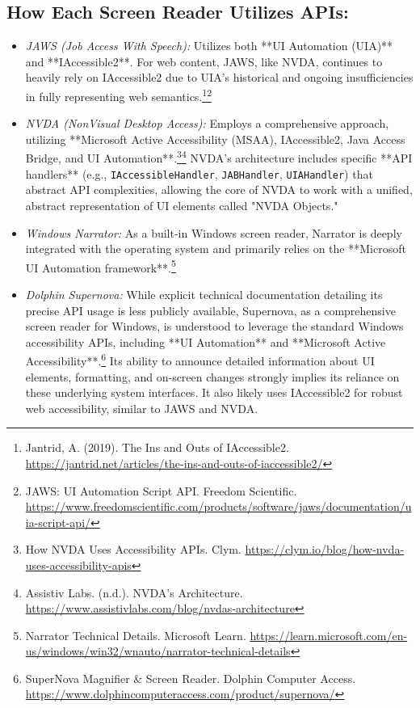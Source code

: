 \subsection*{How Each Screen Reader Utilizes APIs:}
\begin{itemize}
    \item \emph{JAWS (Job Access With Speech):} Utilizes both **UI Automation (UIA)** and **IAccessible2**. For web content, JAWS, like NVDA, continues to heavily rely on IAccessible2 due to UIA's historical and ongoing insufficiencies in fully representing web semantics.\footnote{Jantrid, A. (2019). The Ins and Outs of IAccessible2. \url{https://jantrid.net/articles/the-ins-and-outs-of-iaccessible2/}}\footnote{JAWS: UI Automation Script API. Freedom Scientific. \url{https://www.freedomscientific.com/products/software/jaws/documentation/uia-script-api/}}
    \item \emph{NVDA (NonVisual Desktop Access):} Employs a comprehensive approach, utilizing **Microsoft Active Accessibility (MSAA), IAccessible2, Java Access Bridge, and UI Automation**.\footnote{How NVDA Uses Accessibility APIs. Clym. \url{https://clym.io/blog/how-nvda-uses-accessibility-apis}}\footnote{Assistiv Labs. (n.d.). NVDA's Architecture. \url{https://www.assistivlabs.com/blog/nvdas-architecture}} NVDA's architecture includes specific **API handlers** (e.g., \texttt{IAccessibleHandler}, \texttt{JABHandler}, \texttt{UIAHandler}) that abstract API complexities, allowing the core of NVDA to work with a unified, abstract representation of UI elements called "NVDA Objects."
    \item \emph{Windows Narrator:} As a built-in Windows screen reader, Narrator is deeply integrated with the operating system and primarily relies on the **Microsoft UI Automation framework**.\footnote{Narrator Technical Details. Microsoft Learn. \url{https://learn.microsoft.com/en-us/windows/win32/wnauto/narrator-technical-details}}
    \item \emph{Dolphin Supernova:} While explicit technical documentation detailing its precise API usage is less publicly available, Supernova, as a comprehensive screen reader for Windows, is understood to leverage the standard Windows accessibility APIs, including **UI Automation** and **Microsoft Active Accessibility**.\footnote{SuperNova Magnifier \& Screen Reader. Dolphin Computer Access. \url{https://www.dolphincomputeraccess.com/product/supernova/}} Its ability to announce detailed information about UI elements, formatting, and on-screen changes strongly implies its reliance on these underlying system interfaces. It also likely uses IAccessible2 for robust web accessibility, similar to JAWS and NVDA.
\end{itemize}

